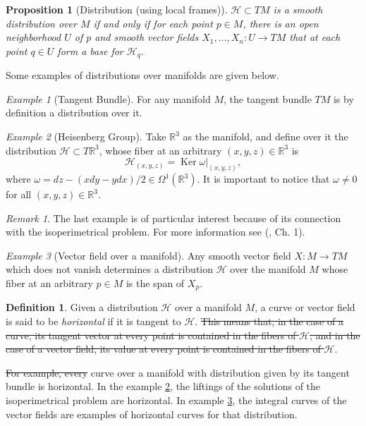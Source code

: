 \documentclass[12pt, letterpaper, reqno]{amsart}
\theoremstyle{definition}
\newtheorem{df}{Definition}
\theoremstyle{plain}
\newtheorem{prop}{Proposition}
\theoremstyle{remark}
\newtheorem{ex}{Example}
\newtheorem{rem}{Remark}
\providecommand{\DIFadd}[1]{{\protect\color{blue}\uwave{#1}}} %
\providecommand{\DIFdel}[1]{{\protect\color{red}\sout{#1}}}                      %
\providecommand{\DIFaddbegin}{} %
\providecommand{\DIFaddend}{} %
\providecommand{\DIFdelbegin}{} %
\providecommand{\DIFdelend}{} %
\newcommand{\DIFscaledelfig}{0.5}
\newlength{\DIFdelgraphicswidth} %
\newlength{\DIFdelgraphicsheight} %
\newcommand{\DIFaddincludegraphics}[2][]{{\color{blue}\fbox{\DIFOincludegraphics[#1]{#2}}}} %
\newcommand{\DIFdelincludegraphics}[2][]{%
\sbox{\DIFdelgraphicsbox}{\DIFOincludegraphics[#1]{#2}}%
\settoboxwidth{\DIFdelgraphicswidth}{\DIFdelgraphicsbox} %
\settoboxtotalheight{\DIFdelgraphicsheight}{\DIFdelgraphicsbox} %
\scalebox{\DIFscaledelfig}{%
\parbox[b]{\DIFdelgraphicswidth}{\usebox{\DIFdelgraphicsbox}\\[-\baselineskip] \rule{\DIFdelgraphicswidth}{0em}}\llap{\resizebox{\DIFdelgraphicswidth}{\DIFdelgraphicsheight}{%
\setlength{\unitlength}{\DIFdelgraphicswidth}%
\begin{picture}(1,1)%
\thicklines\linethickness{2pt} %
{\color[rgb]{1,0,0}\put(0,0){\framebox(1,1){}}}%
{\color[rgb]{1,0,0}\put(0,0){\line( 1,1){1}}}%
{\color[rgb]{1,0,0}\put(0,1){\line(1,-1){1}}}%
\end{picture}%
}\hspace*{3pt}}} %
} %
\DeclareRobustCommand{\DIFaddbegin}{\DIFOaddbegin \let\includegraphics\DIFaddincludegraphics} %
\DeclareRobustCommand{\DIFaddend}{\DIFOaddend \let\includegraphics\DIFOincludegraphics} %
\DeclareRobustCommand{\DIFdelbegin}{\DIFOdelbegin \let\includegraphics\DIFdelincludegraphics} %
\DeclareRobustCommand{\DIFdelend}{\DIFOaddend \let\includegraphics\DIFOincludegraphics} %
\begin{document}
\begin{prop} [Distribution (using local frames)]
	$ \mathcal{H}\subset TM $ is a smooth distribution over $M  $ if and only if  for each point $ p\in M $, there is an open neighborhood $ U $ of $ p $  and smooth vector fields $ X_1,\dots,X_n: U \rightarrow {TM} $ that at each point  $ q\in U $ form a base for $ \mathcal{H}_q. $ 
\end{prop}
Some examples of distributions over manifolds are given below.
\begin{ex}[Tangent Bundle]
	For any manifold $ M $, the tangent bundle $ TM $ is by definition a distribution over it. 
\end{ex}
\begin{ex}[Heisenberg Group]\label{ex:heis_group}
	Take $ \mathbb{R} ^3 $ as the manifold, and define over it the distribution $ \mathcal{H}\subset T \mathbb{R} ^3 $, whose fiber at an arbitrary $ (x,y,z)\in \mathbb{R}^3  $ is   
	$$ \mathcal{H}_{(x,y,z)} = \operatorname{Ker} \omega|_{(x,y,z)},$$
	where $ \omega = dz-(x dy-y dx)/2\in\Omega^1( \mathbb{R}^3).$ It is important to notice that $ \omega\neq 0 $ for all $ (x,y,z)\in \mathbb{R}^3. $ 
\end{ex}
\begin{rem}
	The last example is of particular interest because of its connection with the isoperimetrical problem. For more information see (\cite{montgomery2002tour}, Ch. 1).
\end{rem}
\begin{ex}[Vector field over a manifold]\label{ex:vect_field}
Any smooth vector field $ X: M \rightarrow {TM} $ which does not vanish  determines a distribution $ \mathcal{H}$ over the manifold $ M $ whose fiber at an arbitrary $ p\in M $ is the span of $ X_p. $
\end{ex}

\DIFaddbegin \begin{df}\label{def:horizontal_things}
	\DIFaddend Given a distribution $ \mathcal{H} $  over a manifold $M$,  a curve or vector field is said to be \textit{horizontal} if it is tangent to $ \mathcal{H} $.
\DIFdelbegin \DIFdel{This means that, in the case of a curve, its tangent vector at every point is contained in the fibers of $ \mathcal{H} $; and in the case of a vector field, its value at every point is contained in the fibers of $ \mathcal{H} .$   
}\DIFdelend \DIFaddbegin \end{df}
\DIFaddend 

\DIFdelbegin \DIFdel{For example, every }\DIFdelend \DIFaddbegin \DIFadd{Every }\DIFaddend curve over a manifold with distribution given by its tangent bundle is horizontal. In the example \ref{ex:heis_group}, the liftings of the solutions of the isoperimetrical problem are horizontal. In example \ref{ex:vect_field}, the integral curves of the vector fields are examples of horizontal curves for that distribution.
\end{document}
